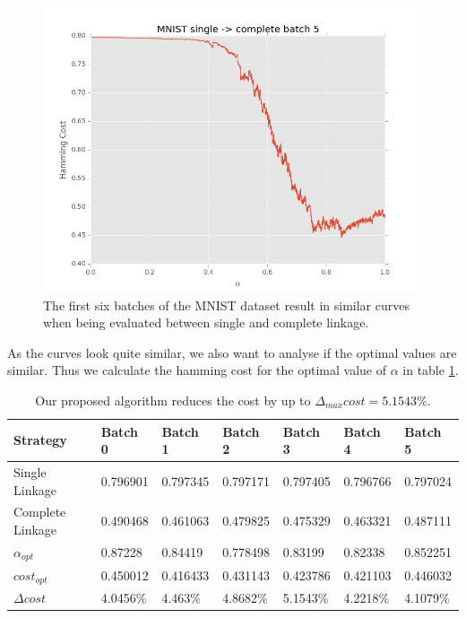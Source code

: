 \begin{figure}[h]
\begin{minipage}{.3\textwidth}
\end{minipage}
\begin{minipage}{.3\textwidth}
  \centering
  \includegraphics[width=\linewidth]{images/mnist-sc-5}
\end{minipage}
\caption{The first six batches of the MNIST dataset result in similar curves when being evaluated between single and complete linkage.}
\label{fig:mnist1000sc}
\end{figure}

As the curves look quite similar, we also want to analyse if the optimal values are similar. Thus we calculate the hamming cost for the optimal value of $\alpha$ in table \ref{table:mnist1000sc}.

\begin{table}[h]
    \centering
    \begin{tabular}{|l | l l l l l l |}
    \hline
    Strategy & Batch 0 & Batch 1 & Batch 2 & Batch 3 & Batch 4 & Batch 5\\ \hline
    Single Linkage & 0.796901 & 0.797345 & 0.797171 & 0.797405 & 0.796766 & 0.797024\\
    Complete Linkage & 0.490468 & 0.461063 & 0.479825 & 0.475329 & 0.463321 & 0.487111\\
    $\alpha_{opt}$ & 0.87228 & 0.84419 & 0.778498 & 0.83199 & 0.82338 & 0.852251\\
    $cost_{opt}$ & 0.450012 & 0.416433 & 0.431143 & 0.423786 & 0.421103 & 0.446032\\
    $\Delta cost$ & 4.0456\% & 4.463\% & 4.8682\% & 5.1543\% & 4.2218\% & 4.1079\%\\\hline
    \end{tabular}
    \caption{Our proposed algorithm reduces the cost by up to $\Delta_{max} cost = 5.1543\%$.}
    \label{table:mnist1000sc}
\end{table}

